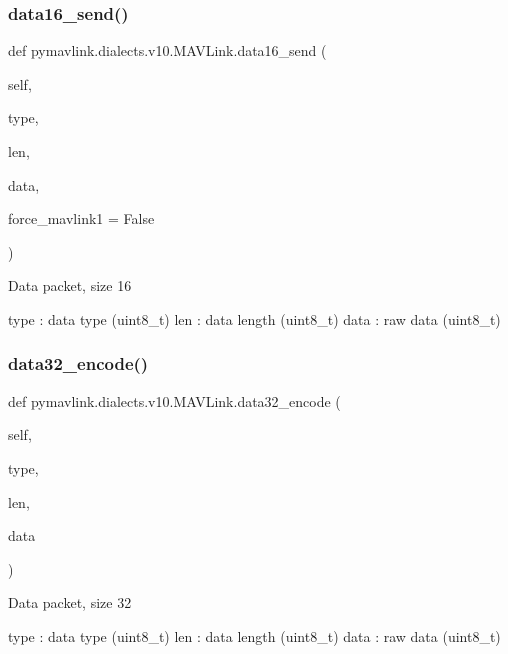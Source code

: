 \begin{DoxyVerb}
\begin{DoxyVerb}
\subsubsection{\texorpdfstring{data16\+\_\+send()}{data16\_send()}}
{\footnotesize\ttfamily def pymavlink.\+dialects.\+v10.\+M\+A\+V\+Link.\+data16\+\_\+send (\begin{DoxyParamCaption}\item[{}]{self,  }\item[{}]{type,  }\item[{}]{len,  }\item[{}]{data,  }\item[{}]{force\+\_\+mavlink1 = {\ttfamily False} }\end{DoxyParamCaption})}

\begin{DoxyVerb}Data packet, size 16

type                      : data type (uint8_t)
len                       : data length (uint8_t)
data                      : raw data (uint8_t)\end{DoxyVerb}
 \mbox{\label{classpymavlink_1_1dialects_1_1v10_1_1MAVLink_ab3d1bd6322296592571df58a13991ff1}} 
\subsubsection{\texorpdfstring{data32\+\_\+encode()}{data32\_encode()}}
{\footnotesize\ttfamily def pymavlink.\+dialects.\+v10.\+M\+A\+V\+Link.\+data32\+\_\+encode (\begin{DoxyParamCaption}\item[{}]{self,  }\item[{}]{type,  }\item[{}]{len,  }\item[{}]{data }\end{DoxyParamCaption})}

\begin{DoxyVerb}Data packet, size 32

type                      : data type (uint8_t)
len                       : data length (uint8_t)
data                      : raw data (uint8_t)\end{DoxyVerb}
 \mbox{\label{classpymavlink_1_1dialects_1_1v10_1_1MAVLink_a70f1fcd5dd9f61bea6c94ec9fb4171db}} 

\end{DoxyVerb}
\end{DoxyVerb}
